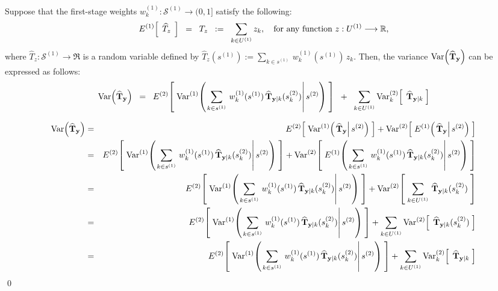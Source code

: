 \documentclass{article}
\begin{document}
\begin{proposition}
\quad
Suppose that
the first-stage weights $w^{(1)}_{k} : \mathcal{S}^{(1)} \longrightarrow (0,1]$
satisfy the following:
\begin{equation*}
E^{(1)}\!\left[\;\,\widehat{T}_{z}\,\;\right] \;\; = \;\; T_{z} \;\;:=\;\; \sum_{k\in U^{(1)}}z_{k},
\quad\textnormal{for any function $z : U^{(1)} \longrightarrow \Re$,}
\end{equation*}
where $\widehat{T}_{z} : \mathcal{S}^{(1)} \longrightarrow \Re$ is a random variable defined by
$\widehat{T}_{z}(s^{(1)}) := \underset{k \in s^{(1)}}{\sum}\,w^{(1)}_{k}(s^{(1)})\,z_{k}$.
Then, the variance $\Var\!\left(\widehat{\mathbf{T}}_{\mathbf{y}}\right)$ can be expressed as follows:
		\begin{equation*}
		\Var\!\left(\widehat{\mathbf{T}}_{\mathbf{y}}\right)
		\;\;=\;\;
		E^{(2)}\!\left[\;\Var^{(1)}\!\left(\left.
		\sum_{k\in s^{(1)}}\,w^{(1)}_{k}(s^{(1)})\,\widehat{\mathbf{T}}_{\mathbf{y}\vert k}(s^{(2)}_{k})
		\right\vert s^{(2)}\right)\;\right]
		\;\;+\;\;
		\sum_{k\in U^{(1)}}\Var^{(2)}_{k}\!\left[\;\,\widehat{\mathbf{T}}_{\mathbf{y}\vert k}\;\right]
		\end{equation*}
\end{proposition}

\proof
\begin{eqnarray*}
\Var\!\left(\widehat{\mathbf{T}}_{\mathbf{y}}\right)
&=&
E^{(2)}\!\left[\;\Var^{(1)}\!\left(\left.\widehat{\mathbf{T}}_{\mathbf{y}}\right\vert s^{(2)}\right)\;\right]
+
\Var^{(2)}\!\left[\;E^{(1)}\!\left(\left.\widehat{\mathbf{T}}_{\mathbf{y}}\right\vert s^{(2)}\right)\;\right] \\
&=&
E^{(2)}\!\left[\;\Var^{(1)}\!\left(\left.
\sum_{k\in s^{(1)}}\,w^{(1)}_{k}(s^{(1)})\,\widehat{\mathbf{T}}_{\mathbf{y}\vert k}(s^{(2)}_{k})
\right\vert s^{(2)}\right)\;\right]
+
\Var^{(2)}\!\left[\;E^{(1)}\!\left(\left.
\sum_{k\in s^{(1)}}\,w^{(1)}_{k}(s^{(1)})\,\widehat{\mathbf{T}}_{\mathbf{y}\vert k}(s^{(2)}_{k})
\right\vert s^{(2)}\right)\;\right]
\\
&=&
E^{(2)}\!\left[\;\Var^{(1)}\!\left(\left.
\sum_{k\in s^{(1)}}\,w^{(1)}_{k}(s^{(1)})\,\widehat{\mathbf{T}}_{\mathbf{y}\vert k}(s^{(2)}_{k})
\right\vert s^{(2)}\right)\;\right]
+
\Var^{(2)}\!\left[\;
\sum_{k\in U^{(1)}}\,\widehat{\mathbf{T}}_{\mathbf{y}\vert k}(s^{(2)}_{k})
\;\right]
\\
&=&
E^{(2)}\!\left[\;\Var^{(1)}\!\left(\left.
\sum_{k\in s^{(1)}}\,w^{(1)}_{k}(s^{(1)})\,\widehat{\mathbf{T}}_{\mathbf{y}\vert k}(s^{(2)}_{k})
\right\vert s^{(2)}\right)\;\right]
+
\sum_{k\in U^{(1)}}
\Var^{(2)}\!\left[\;
\,\widehat{\mathbf{T}}_{\mathbf{y}\vert k}(s^{(2)}_{k})
\;\right]
\\
&=&
E^{(2)}\!\left[\;\Var^{(1)}\!\left(\left.
\sum_{k\in s^{(1)}}\,w^{(1)}_{k}(s^{(1)})\,\widehat{\mathbf{T}}_{\mathbf{y}\vert k}(s^{(2)}_{k})
\right\vert s^{(2)}\right)\;\right]
+
\sum_{k\in U^{(1)}}\Var^{(2)}_{k}\!\left[\;\,\widehat{\mathbf{T}}_{\mathbf{y}\vert k}\;\right]
\end{eqnarray*}
\qed
\end{document}
